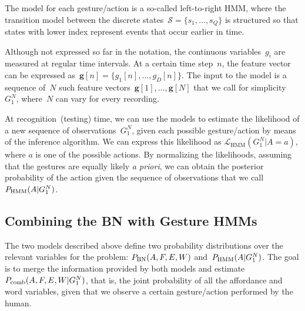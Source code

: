 The model for each gesture/action is a so-called left-to-right \ac{HMM}, where the transition model between the discrete states~$\mathcal{S} = \{s_1, \dots, s_Q\}$ is structured so that states with lower index represent events that occur earlier in time.

Although not expressed so far in the notation, the continuous variables~$g_i$ are measured at regular time intervals.
At a certain time step~$n$, the feature vector can be expressed as~$\mathbf{g}[n] = \{g_1[n], \dots, g_D[n]\}$.
The input to the model is a sequence of~$N$ such feature vectors~$\mathbf{g}[1], \dots, \mathbf{g}[N]$ that we call for simplicity~$G_1^N$, where~$N$ can vary for every recording.

At recognition~(testing) time, we can use the models to estimate the likelihood of a new sequence of observations~$G_1^N$, given each possible gesture/action by means of the \FB{} inference algorithm.
We can express this likelihood as $\mathcal{L}_\text{HMM}(G_1^N|A=a)$, where $a$ is one of the possible actions.
By normalizing the likelihoods, assuming that the gestures are equally likely \emph{a priori}, we can obtain the posterior probability of the action given the sequence of observations that we call~$P_{\text{HMM}}(A|G_1^N)$.


\subsection{Combining the \acs{BN} with Gesture \acsp{HMM}}
\label{sec:combination}
The two models described above define two probability distributions over the relevant variables for the problem:
$P_{\text{BN}}(A, F, E, W)$ and~$P_{\text{HMM}}(A|G_1^N)$.
The goal is to merge the information provided by both models and estimate~$P_\text{comb}(A, F, E, W|G_1^N)$, that is, the joint probability of all the affordance and word variables, given that we observe a certain gesture/action performed by the human.

